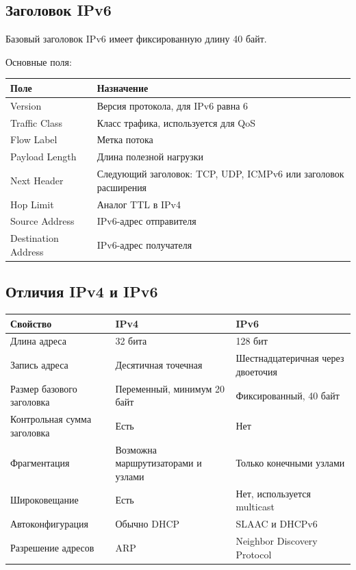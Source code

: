 \documentclass[12pt,a4paper]{article}
\begin{document}
\subsection{Заголовок IPv6}

Базовый заголовок IPv6 имеет фиксированную длину 40 байт.

Основные поля:

\begin{center}
\begin{tabular}{|p{4cm}|p{9cm}|}
\hline
\textbf{Поле} & \textbf{Назначение} \\
\hline
Version & Версия протокола, для IPv6 равна 6 \\
\hline
Traffic Class & Класс трафика, используется для QoS \\
\hline
Flow Label & Метка потока \\
\hline
Payload Length & Длина полезной нагрузки \\
\hline
Next Header & Следующий заголовок: TCP, UDP, ICMPv6 или заголовок расширения \\
\hline
Hop Limit & Аналог TTL в IPv4 \\
\hline
Source Address & IPv6-адрес отправителя \\
\hline
Destination Address & IPv6-адрес получателя \\
\hline
\end{tabular}
\end{center}

\subsection{Отличия IPv4 и IPv6}

\begin{center}
\begin{tabular}{|p{4cm}|p{4cm}|p{4cm}|}
\hline
\textbf{Свойство} & \textbf{IPv4} & \textbf{IPv6} \\
\hline
Длина адреса & 32 бита & 128 бит \\
\hline
Запись адреса & Десятичная точечная & Шестнадцатеричная через двоеточия \\
\hline
Размер базового заголовка & Переменный, минимум 20 байт & Фиксированный, 40 байт \\
\hline
Контрольная сумма заголовка & Есть & Нет \\
\hline
Фрагментация & Возможна маршрутизаторами и узлами & Только конечными узлами \\
\hline
Широковещание & Есть & Нет, используется multicast \\
\hline
Автоконфигурация & Обычно DHCP & SLAAC и DHCPv6 \\
\hline
Разрешение адресов & ARP & Neighbor Discovery Protocol \\
\hline
\end{tabular}
\end{center}
\end{document}
